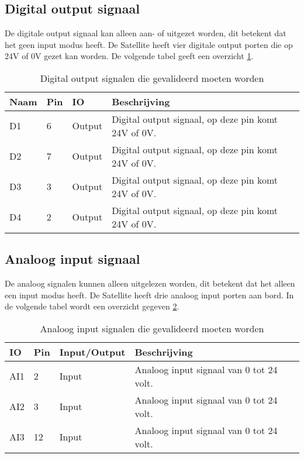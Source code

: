 \subsection{Digital output signaal}
De digitale output signaal kan alleen aan- of uitgezet worden, dit betekent dat het geen input modus heeft. De Satellite heeft vier digitale output porten die op 24V of 0V gezet kan worden. De volgende tabel geeft een overzicht \ref{tab:hw_val_dio}.
\begin{table}[h!]
	\caption{Digital output signalen die gevalideerd moeten worden}
	\begin{tabular}{lllp{12cm}}
	\toprule
	\textbf{Naam} & \textbf{Pin} & \textbf{IO} & \textbf{Beschrijving}				 	\\ \toprule
	D1			  & 6    	& Output	& Digital output signaal, op deze pin komt 24V of 0V. \\
	D2			  & 7    	& Output	& Digital output signaal, op deze pin komt 24V of 0V. \\
	D3			  & 3    	& Output	& Digital output signaal, op deze pin komt 24V of 0V. \\
	D4			  & 2   	& Output	& Digital output signaal, op deze pin komt 24V of 0V. \\ \bottomrule
	\end{tabular}
	\label{tab:hw_val_dio}
\end{table}

\subsection{Analoog input signaal} \label{Analog Input Signaal}
De analoog signalen kunnen alleen uitgelezen worden, dit betekent dat het alleen een input modus heeft. De Satellite heeft drie analoog input porten aan bord. In de volgende tabel wordt een overzicht gegeven \ref{tab:hw_val_ai}.
\begin{table}[h!]
	\caption{Analoog input signalen die gevalideerd moeten worden}
	\begin{tabular}{lllp{12cm}}
	\toprule
	\textbf{IO} & \textbf{Pin} & \textbf{Input/Output} & \textbf{Beschrijving}			\\ \toprule
	AI1			& 2    	& Input		& Analoog input signaal van 0 tot 24 volt.					\\
	AI2			& 3    	& Input		& Analoog input signaal van 0 tot 24 volt.					\\
	AI3			& 12   	& Input		& Analoog input signaal van 0 tot 24 volt.					\\  \bottomrule
	\end{tabular}
	\label{tab:hw_val_ai}
\end{table}

